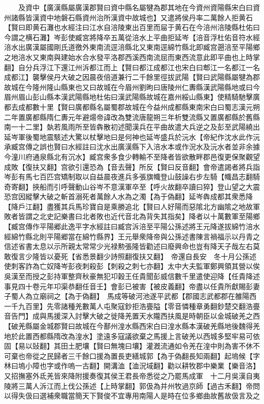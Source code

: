 　　及資中【廣漢縣屬廣漢郡賢曰資中縣名屬犍為郡其地在今資州資陽縣宋白曰資州諸縣皆漢資中地磐石縣資州治所漢資中故城也】又遣將侯丹率二萬餘人拒黄石【賢曰即黄石灘也水經注曰江水自涪陵東出百里而屇于黄石在今涪州涪陵縣杜佑曰今謂之横石灘】岑彭使臧宮將降卒五萬從涪水上平曲拒延岑【涪音浮杜佑音符水經涪水出廣漢屬國剛氏道徼外東南流逕涪縣北又東南逕綿竹縣北即臧宫遡涪至平陽鄉之地涪水又東南與建始水合水發平洛郡西溪西南流屈而東西流意此即平曲也上時掌翻】自分兵浮江下還江州泝都江而上【賢曰都江成都江也宋白曰郫江一名都江一名成都江】襲擊侯丹大破之因晨夜倍道兼行二千餘里徑拔武陽【賢曰武陽縣屬犍為郡故城在今隆州隆山縣東也又曰故城在今眉州劉昫曰唐陵州仁夀縣漢武陽縣地或曰今眉州眉山彭山縣本漢武陽縣地杜佑曰漢武陽縣故城在嘉州綏山縣東】使精騎馳擊廣都去成都數十里【賢曰廣都縣名屬蜀郡故城在今益州成都縣東南宋白曰蜀志漢元朔二年置廣都縣隋仁夀元年避煬帝諱改為雙流唐龍朔三年析雙流縣又置廣都縣於舊縣南一十二里】埶若風雨所至皆犇散初述聞漢兵在平曲故遣大兵逆之及彭至武陽繞出延岑軍後蜀地震駭述大驚以杖擊地曰是何神也延岑盛兵於沅水【帝紀作沈水此作沅承臧宫傳之誤也賢曰水經註曰沈水出廣漢縣下入涪水本或作況水及沅水者並非余據今潼川府通泉縣北有沉水】臧宫衆多食少轉輸不至降者皆欲散畔郡邑復更保聚觀望成敗【復扶又翻】宫欲引還恐為【音去聲】所反【賢曰反音翻】會帝遣謁者將兵詣岑彭有馬七百匹宫矯制取以自益晨夜進兵多張旗幟登山鼓譟右步左騎【幟昌志翻騎奇寄翻】挾船而引呼聲動山谷岑不意漢軍卒至【呼火故翻卒讀曰猝】登山望之大震恐宫因縱擊大破之斬首溺死者萬餘人水為之濁【為于偽翻】延岑犇成都其衆悉降【降戶江翻】盡獲其兵馬珍寶自是乘勝追北【賢曰人好陽而惡隂北方幽隂之地故軍敗者皆謂之北史記樂書曰北者敗也近代音北為背失其指矣】降者以十萬數軍至陽鄉【臧宫傳作平陽郷此逸平字水經註曰臧宫泝涪至平陽公孫述將王元降遂拔綿竹涪水經綿竹縣北則平陽郷當在綿竹縣界】王元舉衆降帝與公孫述書陳言禍福示以丹青之信述省書太息以示所親太常常少光禄勲張隆皆勸述曰廢興命也豈有降天子哉左右莫敢復言少隆皆以憂死【省悉景翻少詩照翻復扶又翻】　帝還自長安　冬十月公孫述使刺客詐為亡奴降岑彭夜刺殺彭【刺殺之刺七亦翻】太中大夫監軍鄭興領其營以俟吳漢至而授之彭持軍整齊秋豪無犯卭穀王任貴聞彭威信數千里遣使迎降【任貴降述事見四十卷元年卭渠恭翻任音壬】會彭已被害【被皮義翻】帝盡以任貴所獻賜彭妻子蜀人為立廟祠之【為于偽翻】　馬成等破河池遂平武都【郡國志武都郡在雒陽西一千九百里】先零諸種羌數萬人屯聚寇鈔拒浩亹隘【零音憐種章勇翻鈔楚交翻浩亹音告門】成與馬援深入討擊大破之徙降羌置天水隴西扶風是時朝臣以金城破羌之西【破羌縣屬金城郡賢曰故城在今鄯州湟水縣西宋白曰湟水縣本漢破羌縣地後魏得羌地於此置西都縣隋改為湟水】塗遠多寇議欲棄之馬援上言破羌以西城多堅牢易可依固【易以䜴翻】其田土肥壤【賢曰無塊曰壤】灌漑流通如令羌在湟中則為害不休不可棄也帝從之民歸者三千餘口援為置長吏繕城郭【為于偽翻長知兩翻】起塢候【字林曰塢小障也字或作嗚一古翻】開溝洫【洫況域翻】勸以耕牧郡中樂業【樂音洛】又招撫塞外氐羌皆來降附援奏復其侯王君長帝悉從之乃罷馬成軍　十二月吳漢自夷陵將三萬人泝江而上伐公孫述【上時掌翻】郭伋為并州牧過京師【過古禾翻】帝問以得失伋曰選補衆職當簡天下賢俊不宜專用南陽人是時在位多鄉曲故舊故伋言及之

